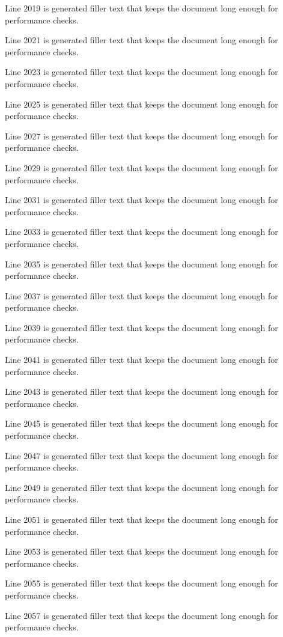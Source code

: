 Line 2019 is generated filler text that keeps the document long enough for performance checks.

Line 2021 is generated filler text that keeps the document long enough for performance checks.

Line 2023 is generated filler text that keeps the document long enough for performance checks.

Line 2025 is generated filler text that keeps the document long enough for performance checks.

Line 2027 is generated filler text that keeps the document long enough for performance checks.

Line 2029 is generated filler text that keeps the document long enough for performance checks.

Line 2031 is generated filler text that keeps the document long enough for performance checks.

Line 2033 is generated filler text that keeps the document long enough for performance checks.

Line 2035 is generated filler text that keeps the document long enough for performance checks.

Line 2037 is generated filler text that keeps the document long enough for performance checks.

Line 2039 is generated filler text that keeps the document long enough for performance checks.

Line 2041 is generated filler text that keeps the document long enough for performance checks.

Line 2043 is generated filler text that keeps the document long enough for performance checks.

Line 2045 is generated filler text that keeps the document long enough for performance checks.

Line 2047 is generated filler text that keeps the document long enough for performance checks.

Line 2049 is generated filler text that keeps the document long enough for performance checks.

Line 2051 is generated filler text that keeps the document long enough for performance checks.

Line 2053 is generated filler text that keeps the document long enough for performance checks.

Line 2055 is generated filler text that keeps the document long enough for performance checks.

Line 2057 is generated filler text that keeps the document long enough for performance checks.

